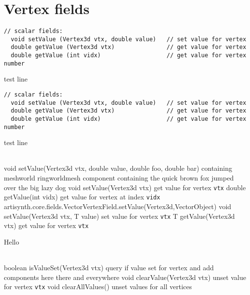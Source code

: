 \documentclass{article}
\begin{document}
\section{Vertex fields}

\begin{lstlisting}[]
  // scalar fields:
  void setValue (Vertex3d vtx, double value)   // set value for vertex
  double getValue (Vertex3d vtx)               // get value for vertex
  double getValue (int vidx)                   // get value for vertex number
\end{lstlisting}
%
test line
%
\begin{lstlisting}[]
  // scalar fields:
  void setValue (Vertex3d vtx, double value)   // set value for vertex
  double getValue (Vertex3d vtx)               // get value for vertex
  double getValue (int vidx)                   // get value for vertex number
\end{lstlisting}
%
test line
%
\begin{methodtable}[\smallskipamount]{0.5}{0.5}
\midline
{}\\
\midline
%
%
{void setValue(\brh Vertex3d vtx, double value, double foo, \brh double bar)}%
{containing meshworld ringworldmesh component containing the quick 
brown fox jumped over the big lazy dog}
%
\methodspace{0.5em}%
%
%
{void setValue(Vertex3d vtx)}%
{get value for vertex {\tt vtx}}
%
%
{double getValue(int vidx)}%
{get value for vertex at index {\tt vidx}}
%
\midline
{}\\
\midline
%
\methodentry
{artisynth.core.fields.VectorVertexField.setValue(Vertex3d,VectorObject)}%
{void setValue(Vertex3d vtx, T value)}%
{set value for vertex {\tt vtx}}
%
%
{T getValue(Vertex3d vtx)}%
{get value for vertex {\tt vtx}}
%
\midline
\end{methodtable}
%
Hello
%
\begin{methodtable}{0.5}{0.5}
\midline
{}\\
\midline
%
%
{boolean isValueSet(Vertex3d vtx)}%
{query if value set for vertex and add components here there and everywhere}
%
%
{void clearValue(Vertex3d vtx)}%
{unset value for vertex {\tt vtx}}
%
%
{void clearAllValues()}%
{unset values for all vertices}
%
\midline
\end{methodtable}
\end{document}
